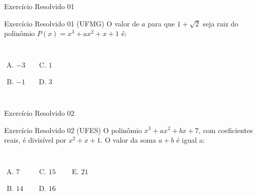 \documentclass[10pt, aspectratio=169]{beamer}
\begin{document}
\begin{frame}{Exercício Resolvido 01}
  \begin{exampleblock}{Exercício Resolvido 01 (UFMG)}
    O valor de $a$ para que $1 + \sqrt{2}$ seja raiz do polinômio $P(x) = x^3 + ax^2 + x + 1$ é:
    \vspace{0.3cm}
    \begin{columns}
      \begin{enumerate}[(A)]
        \item $-3$
        \item $-1$
      \end{enumerate}
      \begin{enumerate}[(A)]
        \setcounter{enumi}{2}
        \item $1$
        \item $3$
      \end{enumerate}
    \end{columns}
  \end{exampleblock}

  
\end{frame}

\begin{frame}{Exercício Resolvido 02}
  \begin{exampleblock}{Exercício Resolvido 02 (UFES)}
    O polinômio $x^3 + ax^2 + bx + 7$, com coeficientes reais, é divisível por $x^2 + x + 1$. O valor da soma $a + b$ é igual a:
    \vspace{0.3cm}
    \begin{columns}
      \begin{enumerate}[(A)]
        \item $7$
        \item $14$
      \end{enumerate}
      \begin{enumerate}[(A)]
        \setcounter{enumi}{2}
        \item $15$
        \item $16$
      \end{enumerate}
      \begin{enumerate}[(A)]
        \setcounter{enumi}{4}
        \item $21$
      \end{enumerate}
    \end{columns}
  \end{exampleblock}

 
\end{frame}
\end{document}
